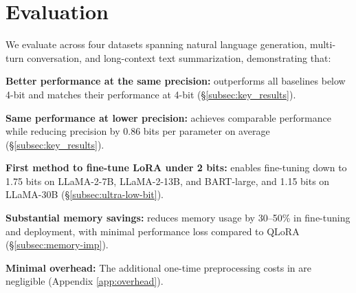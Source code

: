 \section{Evaluation} \label{sec:eval}

We evaluate \FWName across four datasets spanning natural language generation, multi-turn conversation, and long-context text summarization, demonstrating that:
\begin{packeditemize}
    \item 
    \textbf{Better performance at the same precision:} \FWName outperforms all baselines below 4-bit and matches their performance at 4-bit (\S\ref{subsec:key_results}).
    \item 
    \textbf{Same performance at lower precision:} \FWName achieves comparable performance while reducing precision by 0.86 bits per parameter on average (\S\ref{subsec:key_results}).
    \item 
    \textbf{First method to fine-tune LoRA under 2 bits:} \FWName enables fine-tuning down to 1.75 bits on LLaMA-2-7B, LLaMA-2-13B, and BART-large, and 1.15 bits on LLaMA-30B (\S\ref{subsec:ultra-low-bit}).
    \item 
    \textbf{Substantial memory savings:} \FWName reduces memory usage by 30–50\% in fine-tuning and deployment, with minimal performance loss compared to QLoRA (\S\ref{subsec:memory-imp}).
    \item 
    \textbf{Minimal overhead:} The additional one-time preprocessing costs in \FWName are negligible (Appendix \ref{app:overhead}).
\end{packeditemize}

